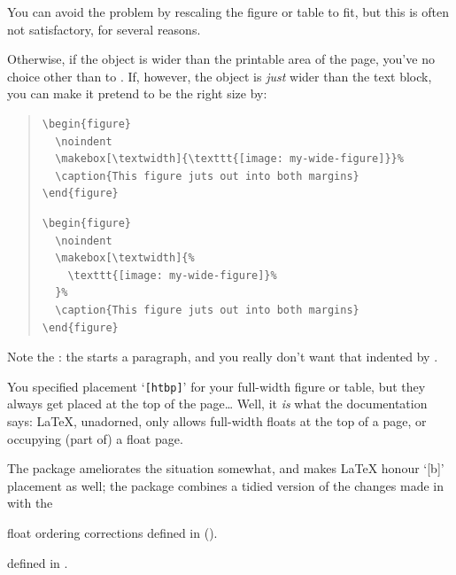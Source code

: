 You can avoid the problem by rescaling the figure or table to fit, but
this is often not satisfactory, for several reasons.

Otherwise, if the object is wider than the printable area of the page,
you've no choice other than to .  If,
however, the object is \emph{just} wider than the text block, you can
make it pretend to be the right size by:
\begin{quote}
\begin{wideversion}
\begin{verbatim}
\begin{figure}
  \noindent
  \makebox[\textwidth]{\texttt{[image: my-wide-figure]}}%
  \caption{This figure juts out into both margins}
\end{figure}
\end{verbatim}
\end{wideversion}
\begin{narrowversion}
\begin{verbatim}
\begin{figure}
  \noindent
  \makebox[\textwidth]{%
    \texttt{[image: my-wide-figure]}%
  }%
  \caption{This figure juts out into both margins}
\end{figure}
\end{verbatim}
\end{narrowversion}
\end{quote}
Note the : the  starts a paragraph, and you
really don't want that indented by .


You specified placement `\texttt{[htbp]}' for your full-width figure or
table, but they always get placed at the top of the page\dots{}  Well,
it \emph{is} what the documentation says: \LaTeX{}, unadorned, only
allows full-width floats at the top of a page, or occupying (part of) a
float page.

The  package ameliorates the situation somewhat, and
makes \LaTeX{} honour `[b]' placement as well; the
 package combines a tidied version of the changes
made in  with the
\begin{narrowversion} %
  float ordering corrections defined in 
  ().
\end{narrowversion}
\begin{wideversion} %
   defined in
  .
\end{wideversion}


